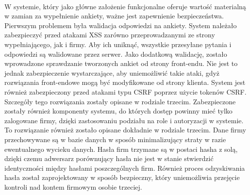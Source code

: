 \paragraph{}
W systemie, który jako główne założenie funkcjonalne oferuje wartość materialną w zamian za wypełnienie ankiety, ważne jest zapewnienie bezpieczeństwa. Pierwszym problemem była walidacja odpowiedzi na ankiety. System należało zabezpieczyć przed atakami XSS zarówno przeprowadzanymi ze strony wypełniającego, jak i firmy. Aby ich uniknąć, wszystkie przesyłane pytania i odpowiedzi są walidowane przez serwer. Jako dodatkową walidację, zostało wprowadzone sprawdzanie tworzonych ankiet od strony front-endu. Nie jest to jednak zabezpieczenie wystarczające, aby uniemożliwić takie ataki, gdyż rozwiązania front-endowe mogą być modyfikowane od strony klienta. System jest również zabezpieczony przed atakami typu CSRF poprzez użycie tokenów CSRF. Szczegóły tego rozwiązania zostały opisane w rodziale trzecim. Zabezpieczone zostały również komponenty systemu, do których dostęp powinny mieć tylko zalogowane firmy, dzięki zastosowaniu podziału na role i autoryzacji w systemie. To rozwiązanie również zostało opisane dokładnie w rodziale trzecim. Dane firmy przechowywane są w bazie danych w sposób minimalizujący straty w razie ewentualnego wycieku danych. Hasła firm trzymane są w postaci hasha z solą, dzięki czemu adwersarz porównujący hasła nie jest w stanie stwierdzić identyczności między hasłami poszczególnych firm. Również proces odzyskiwania hasła został zaprojektowany w sposób bezpieczny, który uniemożliwia przejęcie kontroli nad kontem firmowym osobie trzeciej.